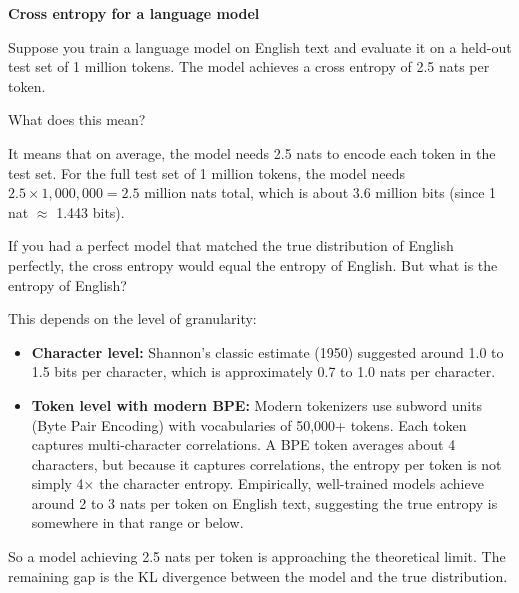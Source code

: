 \begin{examplebox}
\textbf{Cross entropy for a language model}

\vspace{0.5em}

Suppose you train a language model on English text and evaluate it on a held-out test set of 1 million tokens. The model achieves a cross entropy of 2.5 nats per token.

\vspace{0.5em}

What does this mean?

\vspace{0.5em}

It means that on average, the model needs 2.5 nats to encode each token in the test set. For the full test set of 1 million tokens, the model needs $2.5 \times 1{,}000{,}000 = 2.5$ million nats total, which is about 3.6 million bits (since 1 nat $\approx$ 1.443 bits).

\vspace{0.5em}

If you had a perfect model that matched the true distribution of English perfectly, the cross entropy would equal the entropy of English. But what is the entropy of English?

\vspace{0.5em}

This depends on the level of granularity:

\begin{itemize}
\item \textbf{Character level:} Shannon's classic estimate (1950) suggested around 1.0 to 1.5 bits per character, which is approximately 0.7 to 1.0 nats per character.

\item \textbf{Token level with modern BPE:} Modern tokenizers use subword units (Byte Pair Encoding) with vocabularies of 50,000+ tokens. Each token captures multi-character correlations. A BPE token averages about 4 characters, but because it captures correlations, the entropy per token is not simply 4× the character entropy. Empirically, well-trained models achieve around 2 to 3 nats per token on English text, suggesting the true entropy is somewhere in that range or below.
\end{itemize}

\vspace{0.5em}

So a model achieving 2.5 nats per token is approaching the theoretical limit. The remaining gap is the KL divergence between the model and the true distribution.
\end{examplebox}

